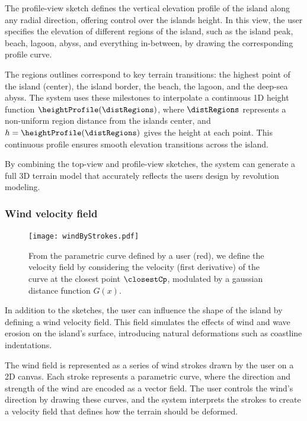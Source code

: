The profile-view sketch defines the vertical elevation profile of the island along any radial direction, offering control over the islands height. In this view, the user specifies the elevation of different regions of the island, such as the island peak, beach, lagoon, abyss, and everything in-between, by drawing the corresponding profile curve.

The regions outlines correspond to key terrain transitions: the highest point of the island (center), the island border, the beach, the lagoon, and the deep-sea abyss. The system uses these milestones to interpolate a continuous 1D height function $\heightProfile(\distRegions)$, where $\distRegions$ represents a non-uniform region distance from the islands center, and $h = \heightProfile(\distRegions)$ gives the height at each point. This continuous profile ensures smooth elevation transitions across the island.

By combining the top-view and profile-view sketches, the system can generate a full 3D terrain model that accurately reflects the users design by revolution modeling.

\subsubsection{Wind velocity field}

\begin{figure}[ht]
    \centering
    \texttt{[image: windByStrokes.pdf]}
    \caption{From the parametric curve defined by a user (red), we define the velocity field by considering the velocity (first derivative) of the curve at the closest point $\closestCp$, modulated by a gaussian distance function $G(x)$. }
    \label{fig:coral-island-wind-from-strokes}
\end{figure}

In addition to the sketches, the user can influence the shape of the island by defining a wind velocity field. This field simulates the effects of wind and wave erosion on the island's surface, introducing natural deformations such as coastline indentations.

The wind field is represented as a series of wind strokes drawn by the user on a 2D canvas. Each stroke represents a parametric curve, where the direction and strength of the wind are encoded as a vector field. The user controls the wind's direction by drawing these curves, and the system interprets the strokes to create a velocity field that defines how the terrain should be deformed.

